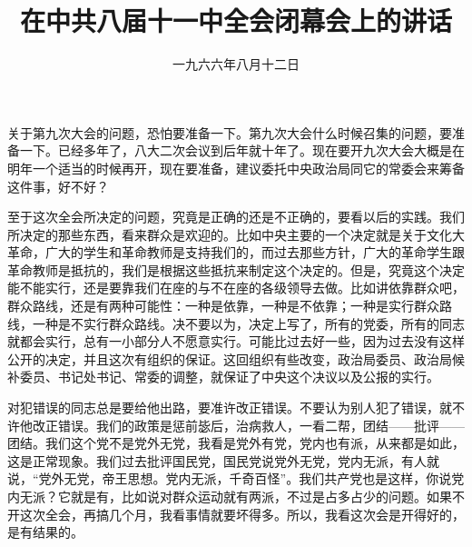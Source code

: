
\title{在中共八届十一中全会闭幕会上的讲话}
\date{一九六六年八月十二日}
\maketitle


关于第九次大会的问题，恐怕要准备一下。第九次大会什么时候召集的问题，要准备一下。已经多年了，八大二次会议到后年就十年了。现在要开九次大会大概是在明年一个适当的时候再开，现在要准备，建议委托中央政治局同它的常委会来筹备这件事，好不好？

至于这次全会所决定的问题，究竟是正确的还是不正确的，要看以后的实践。我们所决定的那些东西，看来群众是欢迎的。比如中央主要的一个决定就是关于文化大革命，广大的学生和革命教师是支持我们的，而过去那些方针，广大的革命学生跟革命教师是抵抗的，我们是根据这些抵抗来制定这个决定的。但是，究竟这个决定能不能实行，还是要靠我们在座的与不在座的各级领导去做。比如讲依靠群众吧，群众路线，还是有两种可能性：一种是依靠，一种是不依靠；一种是实行群众路线，一种是不实行群众路线。决不要以为，决定上写了，所有的党委，所有的同志就都会实行，总有一小部分人不愿意实行。可能比过去好一些，因为过去没有这样公开的决定，并且这次有组织的保证。这回组织有些改变，政治局委员、政治局候补委员、书记处书记、常委的调整，就保证了中央这个决议以及公报的实行。

对犯错误的同志总是要给他出路，要准许改正错误。不要认为别人犯了错误，就不许他改正错误。我们的政策是惩前毖后，治病救人，一看二帮，团结——批评——团结。我们这个党不是党外无党，我看是党外有党，党内也有派，从来都是如此，这是正常现象。我们过去批评国民党，国民党说党外无党，党内无派，有人就说，“党外无党，帝王思想。党内无派，千奇百怪”。我们共产党也是这样，你说党内无派？它就是有，比如说对群众运动就有两派，不过是占多占少的问题。如果不开这次全会，再搞几个月，我看事情就要坏得多。所以，我看这次会是开得好的，是有结果的。
